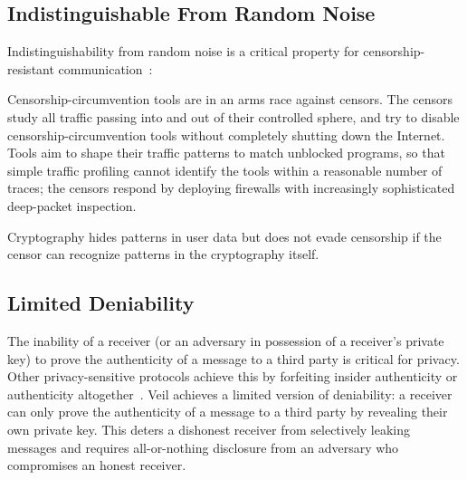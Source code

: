\subsection{Indistinguishable From Random Noise}\label{subsec:security-indistinguishable}

Indistinguishability from random noise is a critical property for censorship-resistant
communication~\cite{bernstein2013}:

\begin{displayquote}
    Censorship-circumvention tools are in an arms race against censors.
    The censors study all traffic passing into and out of their controlled sphere, and try to disable
    censorship-circumvention tools without completely shutting down the Internet.
    Tools aim to shape their traffic patterns to match unblocked programs, so that simple traffic profiling cannot
    identify the tools within a reasonable number of traces;
    the censors respond by deploying firewalls with increasingly sophisticated deep-packet inspection.

    Cryptography hides patterns in user data but does not evade censorship if the censor can recognize patterns in the
    cryptography itself.
\end{displayquote}

\subsection{Limited Deniability}\label{subsec:security-deniability}

The inability of a receiver (or an adversary in possession of a receiver's private key) to prove the authenticity of a
message to a third party is critical for privacy.
Other privacy-sensitive protocols achieve this by forfeiting insider authenticity or authenticity
altogether~\cite{borisov2004}.
Veil achieves a limited version of deniability: a receiver can only prove the authenticity of a message to
a third party by revealing their own private key.
This deters a dishonest receiver from selectively leaking messages and requires all-or-nothing disclosure from an
adversary who compromises an honest receiver.
